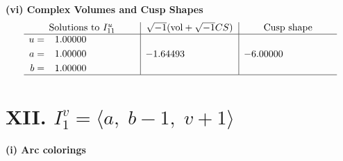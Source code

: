 \documentclass[1p]{elsarticle_modified}
\theoremstyle{definition}
\newcommand{\I}{\sqrt{-1}}
\begin{document}
\newpage\flushleft \textbf{(vi) Complex Volumes and Cusp Shapes}
$$\begin{array}{c|c|c}  
\text{Solutions to }I^u_{11}& \I (\text{vol} + \sqrt{-1}CS) & \text{Cusp shape}\\
 \hline 
\begin{aligned}
u &= \phantom{-}1.00000\phantom{ +0.000000I} \\
a &= \phantom{-}1.00000\phantom{ +0.000000I} \\
b &= \phantom{-}1.00000\phantom{ +0.000000I}\end{aligned}
 & -1.64493\phantom{ +0.000000I} & -6.00000\phantom{ +0.000000I}\\
 \hline 
 \end{array}$$\newpage\newpage\renewcommand{\arraystretch}{1}
\centering \section*{XII. $I^v_{1}= \langle a,\;b-1,\;v+1 \rangle$}
\flushleft \textbf{(i) Arc colorings}\\
\end{document}
